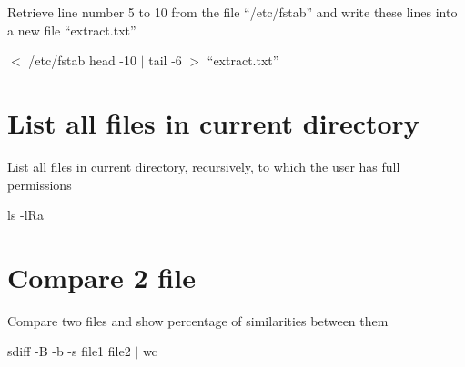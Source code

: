 \documentclass[article, paper=a4, fontsize=11pt]{scrartcl}
\begin{document}
Retrieve line number 5 to 10 from the file “/etc/fstab” and
write these lines into a new file “extract.txt”

$<$ /etc/fstab head -10 $\mid$ tail -6 $>$ “extract.txt”

\section{List all files in current directory}

List all files in current directory, recursively, to which the user has full permissions

ls -lRa

\section{Compare 2 file}

Compare two files and show percentage of similarities between them

sdiff -B -b -s file1 file2 $\mid$ wc
\end{document}
